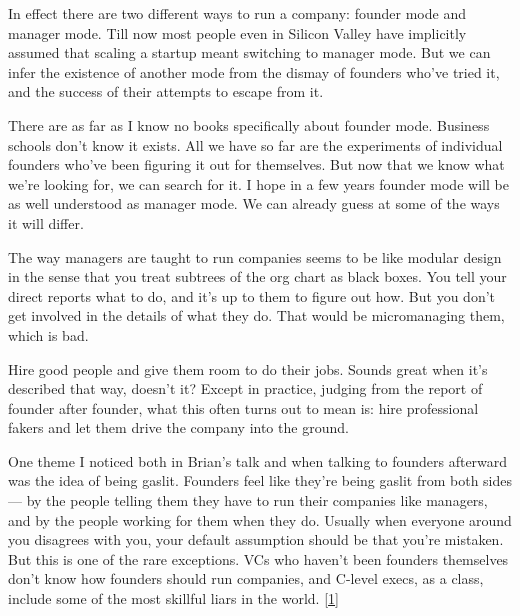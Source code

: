 In
                  effect there are two different ways to run a company: founder
                  mode and manager mode. Till now most people even in Silicon
                  Valley have implicitly assumed that scaling a startup meant
                  switching to manager mode. But we can infer the existence of
                  another mode from the dismay of founders who've tried it, and
                  the success of their attempts to escape from it.

There
                  are as far as I know no books specifically about founder mode.
                  Business schools don't know it exists. All we have so far are
                  the experiments of individual founders who've been figuring it
                  out for themselves. But now that we know what we're looking
                  for, we can search for it. I hope in a few years founder mode
                  will be as well understood as manager mode. We can already
                  guess at some of the ways it will differ.

The way
                  managers are taught to run companies seems to be like modular
                  design in the sense that you treat subtrees of the org chart
                  as black boxes. You tell your direct reports what to do, and
                  it's up to them to figure out how. But you don't get involved
                  in the details of what they do. That would be micromanaging
                  them, which is bad.

Hire good people and give them
                  room to do their jobs. Sounds great when it's described that
                  way, doesn't it? Except in practice, judging from the report
                  of founder after founder, what this often turns out to mean
                  is: hire professional fakers and let them drive the company
                  into the ground.

One theme I noticed both in
                  Brian's talk and when talking to founders afterward was the
                  idea of being gaslit. Founders feel like they're being gaslit
                  from both sides --- by the people telling them they have
                  to run their companies like managers, and by the people
                  working for them when they do. Usually when everyone around
                  you disagrees with you, your default assumption should be that
                  you're mistaken. But this is one of the rare exceptions. VCs
                  who haven't been founders themselves don't know how founders
                  should run companies, and C-level execs, as a class, include
                  some of the most skillful liars in the world.
                  [\href{\#f1n}{1}]

